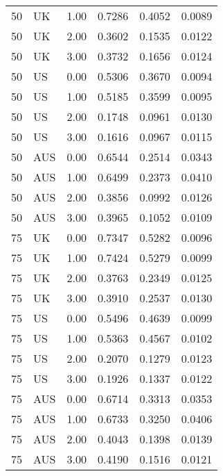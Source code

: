 \begin{table}[ht]
\begin{tabular}{llrlll}
  50 & UK & 1.00 & 0.7286 & 0.4052 & 0.0089 \\ 
  50 & UK & 2.00 & 0.3602 & 0.1535 & 0.0122 \\ 
  50 & UK & 3.00 & 0.3732 & 0.1656 & 0.0124 \\ 
  50 & US & 0.00 & 0.5306 & 0.3670 & 0.0094 \\ 
  50 & US & 1.00 & 0.5185 & 0.3599 & 0.0095 \\ 
  50 & US & 2.00 & 0.1748 & 0.0961 & 0.0130 \\ 
  50 & US & 3.00 & 0.1616 & 0.0967 & 0.0115 \\ 
  50 & AUS & 0.00 & 0.6544 & 0.2514 & 0.0343 \\ 
  50 & AUS & 1.00 & 0.6499 & 0.2373 & 0.0410 \\ 
  50 & AUS & 2.00 & 0.3856 & 0.0992 & 0.0126 \\ 
  50 & AUS & 3.00 & 0.3965 & 0.1052 & 0.0109 \\ 
  75 & UK & 0.00 & 0.7347 & 0.5282 & 0.0096 \\ 
  75 & UK & 1.00 & 0.7424 & 0.5279 & 0.0099 \\ 
  75 & UK & 2.00 & 0.3763 & 0.2349 & 0.0125 \\ 
  75 & UK & 3.00 & 0.3910 & 0.2537 & 0.0130 \\ 
  75 & US & 0.00 & 0.5496 & 0.4639 & 0.0099 \\ 
  75 & US & 1.00 & 0.5363 & 0.4567 & 0.0102 \\ 
  75 & US & 2.00 & 0.2070 & 0.1279 & 0.0123 \\ 
  75 & US & 3.00 & 0.1926 & 0.1337 & 0.0122 \\ 
  75 & AUS & 0.00 & 0.6714 & 0.3313 & 0.0353 \\ 
  75 & AUS & 1.00 & 0.6733 & 0.3250 & 0.0406 \\ 
  75 & AUS & 2.00 & 0.4043 & 0.1398 & 0.0139 \\ 
  75 & AUS & 3.00 & 0.4190 & 0.1516 & 0.0121 \\ 
   \hline
\end{tabular}
\end{table}
